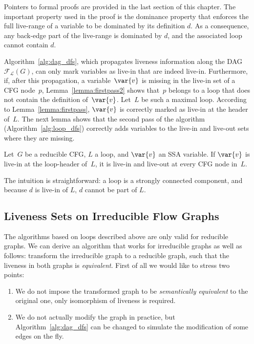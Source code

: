 Pointers to formal proofs are provided in the last section of this chapter.
The important property used in the proof is the dominance property that enforces the full live-range of a variable to be dominated by its definition $d$.
As a consequence, any back-edge part of the live-range is dominated by $d$, and 
the associated loop cannot contain $d$.

Algorithm~\ref{alg:dag_dfs}, which propagates liveness information along the DAG $\mathcal{F}_\mathcal{L}(G)$, can only mark variables as live-in that are indeed live-in.
Furthermore, if, after this propagation, a variable~$\var{v}$ is missing in the live-in set of a CFG node~$p$, Lemma~\ref{lemma:firstpass2} shows that~$p$ belongs to a loop that does not contain the definition of~$\var{v}$.
Let~$L$ be such a maximal loop.
According to Lemma~\ref{lemma:firstpass}, $\var{v}$ is correctly marked as live-in at the header of~$L$.
The next lemma shows that the second pass of the algorithm (Algorithm~\ref{alg:loop_dfs}) correctly adds variables to the live-in and live-out sets where they are missing.

\begin{lemma}
	\label{lemma:secondpass}
	Let~$G$ be a reducible CFG, $L$ a loop, and $\var{v}$ an SSA variable.
	If $\var{v}$ is live-in at the loop-header of~$L$, it is live-in and live-out at every CFG node in~$L$.
\end{lemma}

The intuition is straightforward: a loop is a strongly connected component, and because $d$ is live-in of $L$, $d$ cannot be part of $L$. 


 \subsection{Liveness Sets on Irreducible Flow Graphs}
\label{sec:irreducible}

The algorithms based on loops described above are only valid for reducible 
graphs.
We can derive an algorithm that works for irreducible graphs as well as 
follows:
transform the irreducible graph to a reducible 
graph, such that the liveness in both graphs is 
\emph{equivalent}.
First of all we would like to stress two points:
\begin{enumerate}
\item We do not impose the transformed graph to be \emph{semantically 
equivalent} to the original one, only isomorphism of liveness is required.  
\item We do not actually modify the graph in practice, but 
  Algorithm~\ref{alg:dag_dfs} can be changed to simulate the modification of 
  some edges on the fly.
\end{enumerate}

